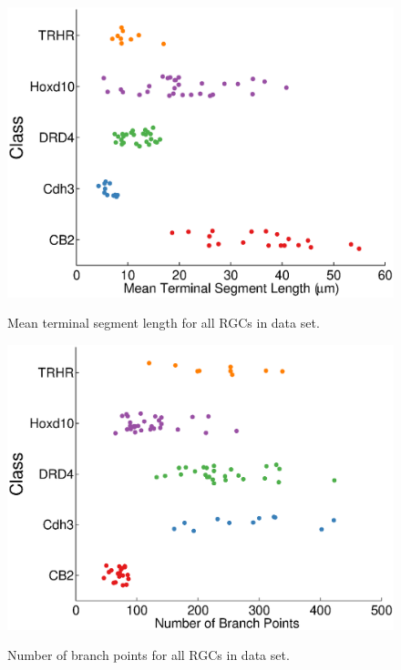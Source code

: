 \documentclass{article}
\begin{document}
\begin{figure}
  \centering
  {\includegraphics[scale=0.75]{Figures/SupFig3/plotFeatures-meanTerminalSegmentLength.eps}}
  \caption{Mean terminal segment length for all RGCs in data set.}
\end{figure}


\begin{figure}
  \centering
  {\includegraphics[scale=0.75]{Figures/SupFig3/plotFeatures-numBranchPoints.eps}}
  \caption{Number of branch points for all RGCs in data set.}
\end{figure}

\clearpage
\end{document}
